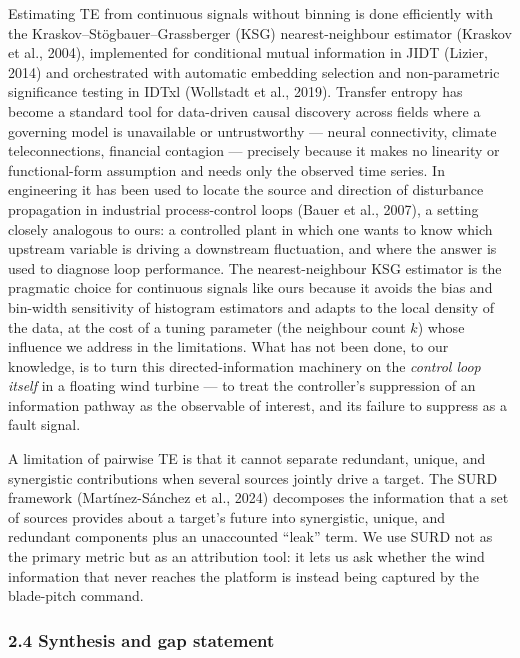 \documentclass[
  english,
  11pt,
]{article}
\begin{document}
Estimating TE from continuous signals without binning is done
efficiently with the Kraskov--Stögbauer--Grassberger (KSG)
nearest-neighbour estimator (Kraskov et al., 2004), implemented for
conditional mutual information in JIDT (Lizier, 2014) and orchestrated
with automatic embedding selection and non-parametric significance
testing in IDTxl (Wollstadt et al., 2019). Transfer entropy has become a
standard tool for data-driven causal discovery across fields where a
governing model is unavailable or untrustworthy --- neural connectivity,
climate teleconnections, financial contagion --- precisely because it
makes no linearity or functional-form assumption and needs only the
observed time series. In engineering it has been used to locate the
source and direction of disturbance propagation in industrial
process-control loops (Bauer et al., 2007), a setting closely analogous
to ours: a controlled plant in which one wants to know which upstream
variable is driving a downstream fluctuation, and where the answer is
used to diagnose loop performance. The nearest-neighbour KSG estimator
is the pragmatic choice for continuous signals like ours because it
avoids the bias and bin-width sensitivity of histogram estimators and
adapts to the local density of the data, at the cost of a tuning
parameter (the neighbour count \(k\)) whose influence we address in the
limitations. What has not been done, to our knowledge, is to turn this
directed-information machinery on the \emph{control loop itself} in a
floating wind turbine --- to treat the controller's suppression of an
information pathway as the observable of interest, and its failure to
suppress as a fault signal.

A limitation of pairwise TE is that it cannot separate redundant,
unique, and synergistic contributions when several sources jointly drive
a target. The SURD framework (Martínez-Sánchez et al., 2024) decomposes
the information that a set of sources provides about a target's future
into synergistic, unique, and redundant components plus an unaccounted
``leak'' term. We use SURD not as the primary metric but as an
attribution tool: it lets us ask whether the wind information that never
reaches the platform is instead being captured by the blade-pitch
command.

\subsubsection{2.4 Synthesis and gap
statement}\label{synthesis-and-gap-statement}
\end{document}
